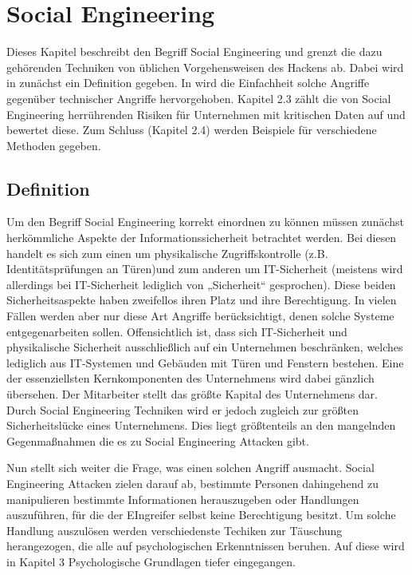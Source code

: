 \section{Social Engineering}\label{sec:social_engineering}
Dieses Kapitel beschreibt den Begriff Social Engineering und grenzt die dazu gehörenden Techniken von
üblichen Vorgehensweisen des Hackens ab. Dabei wird in  zunächst ein Definition gegeben.
In  wird die Einfachheit solche Angriffe gegenüber technischer Angriffe
hervorgehoben.
Kapitel 2.3 zählt die von Social Engineering herrührenden Risiken für Unternehmen mit kritischen Daten
auf und bewertet diese.
Zum Schluss (Kapitel 2.4) werden Beispiele für verschiedene Methoden gegeben.

\subsection{Definition}\label{sec:definition}
Um den Begriff Social Engineering korrekt einordnen zu können müssen zunächst herkömmliche Aspekte der
Informationssicherheit betrachtet werden.
Bei diesen handelt es sich zum einen um physikalische Zugriffskontrolle (z.B. Identitätsprüfungen an
Türen)und zum anderen um IT-Sicherheit (meistens wird allerdings bei IT-Sicherheit lediglich von
„Sicherheit“ gesprochen).
Diese beiden Sicherheitsaspekte haben zweifellos ihren Platz und ihre Berechtigung.
In vielen Fällen werden aber nur diese Art Angriffe berücksichtigt, denen solche Systeme
entgegenarbeiten sollen.
Offensichtlich ist, dass sich IT-Sicherheit und physikalische Sicherheit ausschließlich auf ein
Unternehmen beschränken, welches lediglich aus IT-Systemen und Gebäuden mit Türen und Fenstern
bestehen.
Eine der essenziellsten Kernkomponenten des Unternehmens wird dabei gänzlich übersehen.
Der Mitarbeiter stellt das größte Kapital des Unternehmens dar. Durch Social Engineering Techniken
wird er jedoch zugleich zur größten Sicherheitslücke eines Unternehmens.
Dies liegt größtenteils an den mangelnden Gegenmaßnahmen die es zu Social Engineering Attacken gibt.

Nun stellt sich weiter die Frage, was einen solchen Angriff ausmacht.
Social Engineering Attacken zielen darauf ab, bestimmte Personen dahingehend zu manipulieren bestimmte
Informationen herauszugeben oder Handlungen auszuführen, für die der EIngreifer selbst keine
Berechtigung besitzt.
Um solche Handlung auszulösen werden verschiedenste Techiken zur Täuschung herangezogen, die alle auf
psychologischen Erkenntnissen beruhen.
Auf diese wird in Kapitel 3 Psychologische Grundlagen tiefer eingegangen.

